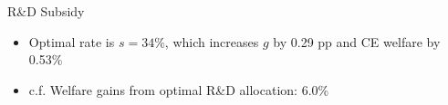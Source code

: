 \documentclass[
  10pt,               %
  aspectratio=169,     %
]{beamer}
\theoremstyle{plain}
\begin{document}
\begin{frame}{R\&D Subsidy}
  \begin{center}
    \begin{figure}
      \centering{}\setcounter{subfigure}{0}
    \end{figure}
    \par\end{center}
    \begin{itemize}
      \item Optimal rate is $s=34\%$, which increases $g$ by 0.29 pp and CE welfare by 0.53\%
      \item c.f. Welfare gains from optimal R\&D allocation: 6.0\% 
    \end{itemize}
\end{frame}
\end{document}

